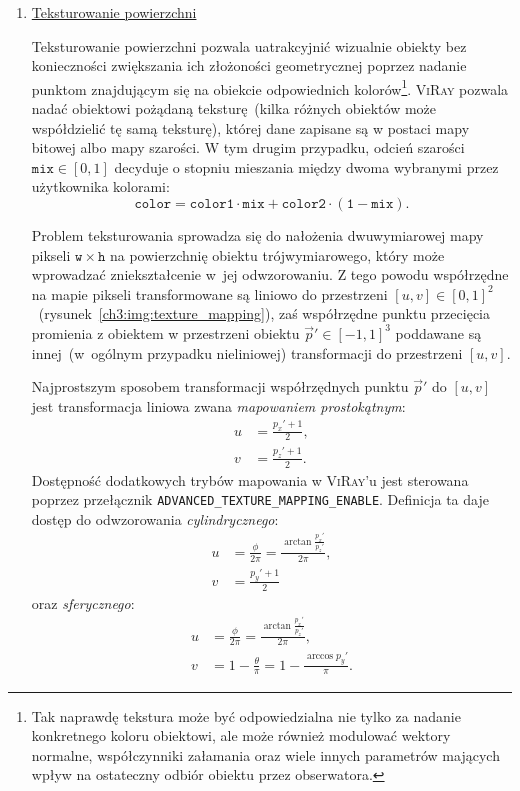 \begin{enumerate}


\item \underline{Teksturowanie powierzchni}

Teksturowanie powierzchni pozwala uatrakcyjnić wizualnie obiekty bez konieczności zwiększania ich złożoności geometrycznej poprzez nadanie punktom znajdującym się na obiekcie odpowiednich kolorów\footnote{Tak naprawdę tekstura może być odpowiedzialna nie tylko za nadanie konkretnego koloru obiektowi, ale może również modulować wektory normalne, współczynniki załamania oraz wiele innych parametrów mających wpływ na ostateczny odbiór obiektu przez obserwatora.}. \textsc{ViRay} pozwala nadać obiektowi pożądaną teksturę~(kilka różnych obiektów może współdzielić tę samą teksturę), której dane zapisane są w postaci mapy bitowej albo mapy szarości. W tym drugim przypadku, odcień szarości $\mathtt{mix}\in[0, 1]$ decyduje o stopniu mieszania między dwoma wybranymi przez użytkownika kolorami:
\begin{equation*}
\mathtt{color = color1\cdot mix + color2\cdot\left(1 - mix \right)}.
\end{equation*}

Problem teksturowania sprowadza się do nałożenia dwuwymiarowej mapy pikseli $\mathtt{w}\times\mathtt{h}$ na powierzchnię obiektu trójwymiarowego, który może wprowadzać zniekształcenie w~jej odwzorowaniu. Z tego powodu współrzędne na mapie pikseli transformowane są liniowo do przestrzeni $[u, v] \in [0, 1]^2$~(rysunek~\ref{ch3:img:texture_mapping}), zaś współrzędne punktu przecięcia promienia z obiektem w przestrzeni obiektu $\vec{p}'\in[-1, 1]^3$ poddawane są innej~(w~ogólnym przypadku nieliniowej) transformacji do przestrzeni $[u, v]$. 



Najprostszym sposobem transformacji współrzędnych punktu $\vec{p}'$ do $[u,v]$ jest transformacja liniowa zwana \textit{mapowaniem prostokątnym}:
\begin{align*}
u &= \frac{p_x' + 1}{2},\\
v &= \frac{p_z' + 1}{2}.
\end{align*}
Dostępność dodatkowych trybów mapowania w \textsc{ViRay}'u jest sterowana poprzez przełącznik \texttt{ADVANCED\_TEXTURE\_MAPPING\_ENABLE}. Definicja ta daje dostęp do odwzorowania \textit{cylindrycznego}:
\begin{align*}
u &= \frac{\phi}{2\pi} = \frac{\arctan\frac{p_x'}{p_z'}}{2\pi},\\
v &= \frac{p_y' + 1}{2}
\end{align*} 
oraz \textit{sferycznego}:
\begin{align*}
u &= \frac{\phi}{2\pi} = \frac{\arctan\frac{p_x'}{p_z'}}{2\pi},\\
v &= 1 - \frac{\theta}{\pi} = 1 - \frac{\arccos p_y'}{\pi}.
\end{align*} 


\end{enumerate}

